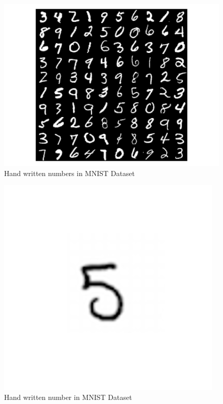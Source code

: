 \begin{figure}[!ht]
        \centering\includegraphics[width=\columnwidth]
        {images/mnist-digits-small.png}
        \caption{Hand written numbers in MNIST Dataset~\cite{hid-sp18-401-MNIST-image}}
        \label{f:MNIST-digits-small}
\end{figure}

\begin{figure}[!ht]
        \centering\includegraphics[width=\columnwidth]
        {images/mnist-digit-big.png}
        \caption{Hand written number in MNIST Dataset~\cite{hid-sp18-401-MNIST-single-digit-image}}
        \label{f:MNIST-digit}
\end{figure}

